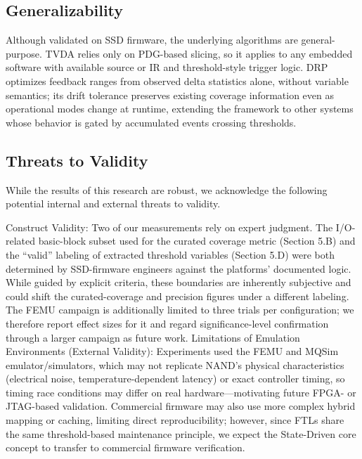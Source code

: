 \documentclass[conference]{IEEEtran}
\begin{document}
\subsection{Generalizability}
Although validated on SSD firmware, the underlying algorithms are general-purpose.
TVDA relies only on PDG-based slicing, so it applies to any embedded software with available source or IR and threshold-style trigger logic.
DRP optimizes feedback ranges from observed delta statistics alone, without variable semantics; its drift tolerance preserves existing coverage information even as operational modes change at runtime, extending the framework to other systems whose behavior is gated by accumulated events crossing thresholds.

\subsection{Threats to Validity}
While the results of this research are robust, we acknowledge the following potential internal and external threats to validity.

Construct Validity: Two of our measurements rely on expert judgment.
The I/O-related basic-block subset used for the curated coverage metric (Section 5.B) and the ``valid'' labeling of extracted threshold variables (Section 5.D) were both determined by SSD-firmware engineers against the platforms' documented logic.
While guided by explicit criteria, these boundaries are inherently subjective and could shift the curated-coverage and precision figures under a different labeling.
The FEMU campaign is additionally limited to three trials per configuration; we therefore report effect sizes for it and regard significance-level confirmation through a larger campaign as future work.
Limitations of Emulation Environments (External Validity): Experiments used the FEMU and MQSim emulator/simulators, which may not replicate NAND's physical characteristics (electrical noise, temperature-dependent latency) or exact controller timing, so timing race conditions may differ on real hardware---motivating future FPGA- or JTAG-based validation.
Commercial firmware may also use more complex hybrid mapping or caching, limiting direct reproducibility; however, since FTLs share the same threshold-based maintenance principle, we expect the State-Driven core concept to transfer to commercial firmware verification.
\end{document}
